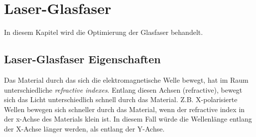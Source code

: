 \section{Laser-Glasfaser}
In diesem Kapitel wird die Optimierung der Glasfaser behandelt.

\subsection{Laser-Glasfaser Eigenschaften}
Das Material durch das sich die elektromagnetische Welle bewegt, hat im Raum unterschiedliche \textit{refractive indexes}. Entlang diesen Achsen (refractive), bewegt sich das Licht unterschiedlich schnell durch das Material. Z.B. X-polarisierte Wellen bewegen sich schneller durch das Material, wenn der refractive index in der x-Achse des Materials klein ist. In diesem Fall würde die Wellenlänge entlang der X-Achse länger werden, als entlang der Y-Achse.